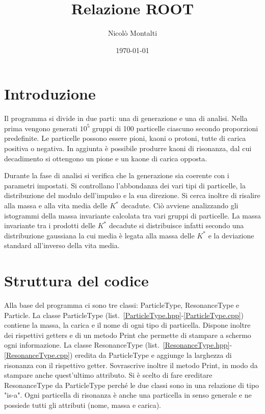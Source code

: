 \documentclass[a4paper,10pt]{article}
\title{Relazione ROOT}
\author{Nicolò Montalti}
\date{\today}
\begin{document}
\maketitle
\section{Introduzione}
Il programma si divide in due parti: una di generazione e una di analisi. Nella prima vengono generati $10^5$ gruppi di 100 particelle ciascuno secondo proporzioni predefinite. Le particelle possono essere pioni, kaoni o protoni, tutte di carica positiva o negativa. In aggiunta è possibile produrre kaoni di risonanza, dal cui decadimento si ottengono un pione e un kaone di carica opposta.

Durante la fase di analisi si verifica che la generazione sia coerente con i parametri impostati. Si controllano l'abbondanza dei vari tipi di particelle, la distribuzione del modulo dell'impulso e la sua direzione. Si cerca inoltre di risalire alla massa e alla vita media delle $K^*$ decadute. Ciò avviene analizzando gli istogrammi della massa invariante calcolata tra vari gruppi di particelle. La massa invariante tra i prodotti delle $K^*$ decadute si distribuisce infatti secondo una distribuzione gaussiana la cui media è legata alla massa delle $K^*$ e la deviazione standard all'inverso della vita media.

\section{Struttura del codice}
Alla base del programma ci sono tre classi: ParticleType, ResonanceType e Particle. La classe ParticleType (list.~\ref{ParticleType.hpp}-\ref{ParticleType.cpp}) contiene la massa, la carica e il nome di ogni tipo di particella. Dispone inoltre dei rispettivi getters e di un metodo Print che permette di stampare a schermo ogni informazione. La classe ResonanceType (list.~\ref{ResonanceType.hpp}-\ref{ResonanceType.cpp}) eredita da ParticleType e aggiunge la larghezza di risonanza con il rispettivo getter. Sovrascrive inoltre il metodo Print, in modo da stampare anche quest'ultimo attributo. Si è scelto di fare ereditare ResonanceType da ParticleType perché le due classi sono in una relazione di tipo "is-a". Ogni particella di risonanza è anche una particella in senso generale e ne possiede tutti gli attributi (nome, massa e carica).
\end{document}
